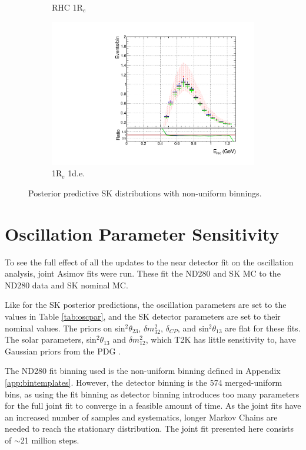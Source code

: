 \begin{figure}[!htbp]
\begin{subfigure}{.49\textwidth}
   \caption{RHC 1R$_{e}$}
  \label{fig:skppnuebar}
  \end{subfigure}
\begin{subfigure}{.49\textwidth}
  \centering
  \includegraphics[width=0.95\linewidth]{figs/polySKnue1pi}
   \caption{1R$_{e}$ 1d.e.}
  \label{fig:skppnue1pi}
\end{subfigure}
\caption{Posterior predictive SK distributions with non-uniform binnings.}
\label{fig:skpppoly}
\end{figure}

\section{Oscillation Parameter Sensitivity}\label{sec:oscpar}

To see the full effect of all the updates to the near detector fit on the oscillation analysis, joint Asimov fits were run. These fit the ND280 and SK MC to the ND280 data and SK nominal MC. 

Like for the SK posterior predictions, the oscillation parameters are set to the values in Table \ref{tab:oscpar}, and the SK detector parameters are set to their nominal values. The priors on sin$^2\theta_{23}$, $\delta m_{32}^2$, $\delta_{CP}$, and sin$^2\theta_{13}$ are flat for these fits. The solar parameters, sin$^2\theta_{13}$ and $\delta m_{12}^2$, which T2K has little sensitivity to, have Gaussian priors from the PDG \cite{pdg}.

The ND280 fit binning used is the non-uniform binning defined in Appendix \ref{app:bintemplates}. However, the detector binning is the 574 merged-uniform bins, as using the fit binning as detector binning introduces too many parameters for the full joint fit to converge in a feasible amount of time. As the joint fits have an increased number of samples and systematics, longer Markov Chains are needed to reach the stationary distribution. The joint fit presented here consists of $\sim$21 million steps. 


